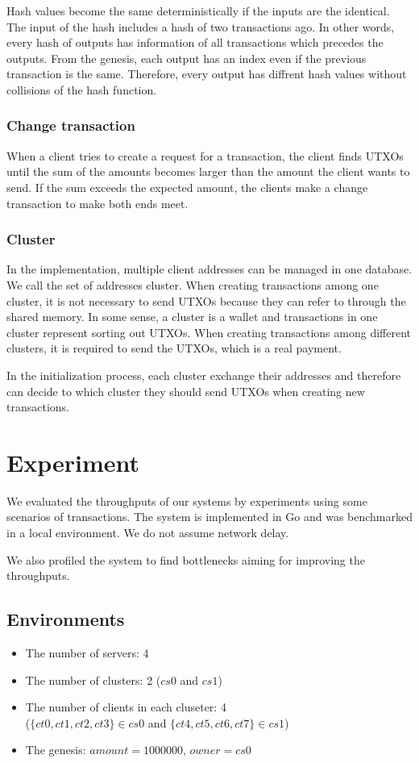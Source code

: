 \documentclass[a4paper, oneside]{discothesis}
\begin{document}
Hash values become the same deterministically if the inputs are the identical.
The input of the hash includes a hash of two transactions ago.
In other words, every hash of outputs has information of all transactions
which precedes the outputs.
From the genesis, each output has an index even if the previous transaction is the same.
Therefore, every output has diffrent hash values without collisions of the hash function.


\subsection{Change transaction}
When a client tries to create a request for a transaction,
the client finds UTXOs until the sum of the amounts
becomes larger than the amount the client wants to send.
If the sum exceeds the expected amount, the clients make a change transaction
to make both ends meet.

\subsection{Cluster}
In the implementation, multiple client addresses can be managed in one database.
We call the set of addresses cluster.
When creating transactions among one cluster, it is not necessary to send UTXOs
because they can refer to through the shared memory.
In some sense, a cluster is a wallet and transactions in one cluster represent sorting out UTXOs.
When creating transactions among different clusters, it is required to send the UTXOs,
which is a real payment.

In the initialization process, each cluster exchange their addresses
and therefore can decide to which cluster they should send UTXOs when creating new transactions.


\chapter{Experiment}
We evaluated the throughputs of our systems by experiments using some scenarios of transactions.
The system is implemented in Go and was benchmarked in a local environment.
We do not assume network delay.

We also profiled the system to find bottlenecks aiming for improving the throughputs.

\section{Environments}
\begin{itemize}
    \item The number of servers: 4
    \item The number of clusters: 2 ($cs0$ and $cs1$)
    \item The number of clients in each cluseter: 4\\
        ($\{ct0, ct1, ct2, ct3\} \in cs0$ and $\{ct4, ct5, ct6, ct7\} \in cs1$)
    \item The genesis: $amount = 1000000$, $owner = cs0$
\end{itemize}
\end{document}
